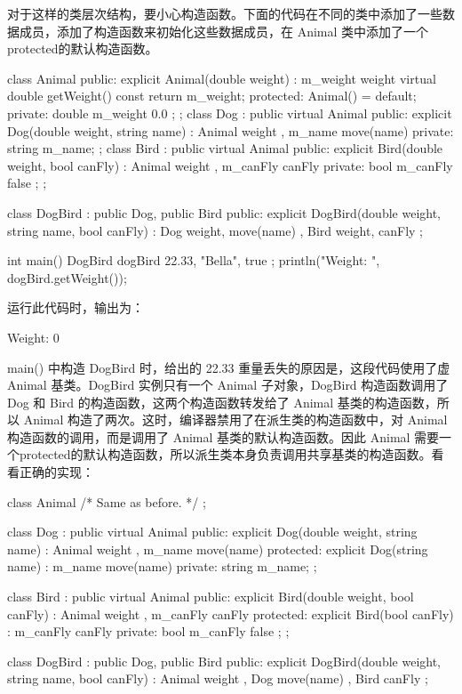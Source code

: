 对于这样的类层次结构，要小心构造函数。下面的代码在不同的类中添加了一些数据成员，添加了构造函数来初始化这些数据成员，在 Animal 类中添加了一个protected的默认构造函数。

\begin{cpp}
class Animal
{
    public:
        explicit Animal(double weight) : m_weight { weight } {}
        virtual double getWeight() const { return m_weight; }
    protected:
        Animal() = default;
    private:
        double m_weight { 0.0 };
};
class Dog : public virtual Animal
{
    public:
        explicit Dog(double weight, string name)
            : Animal { weight }, m_name { move(name) } {}
    private:
        string m_name;
};
class Bird : public virtual Animal
{
    public:
        explicit Bird(double weight, bool canFly)
            : Animal { weight }, m_canFly { canFly } {}
    private:
        bool m_canFly { false };
};

class DogBird : public Dog, public Bird
{
    public:
        explicit DogBird(double weight, string name, bool canFly)
            : Dog { weight, move(name) }, Bird { weight, canFly } {}
};

int main()
{
    DogBird dogBird { 22.33, "Bella", true };
    println("Weight: {}", dogBird.getWeight());
}
\end{cpp}

运行此代码时，输出为：

\begin{cpp}
Weight: 0
\end{cpp}

main() 中构造 DogBird 时，给出的 22.33 重量丢失的原因是，这段代码使用了虚 Animal 基类。DogBird 实例只有一个 Animal 子对象，DogBird 构造函数调用了 Dog 和 Bird 的构造函数，这两个构造函数转发给了 Animal 基类的构造函数，所以 Animal 构造了两次。这时，编译器禁用了在派生类的构造函数中，对 Animal 构造函数的调用，而是调用了 Animal 基类的默认构造函数。因此 Animal 需要一个protected的默认构造函数，所以派生类本身负责调用共享基类的构造函数。看看正确的实现：

\begin{cpp}
class Animal { /* Same as before. */ };

class Dog : public virtual Animal
{
    public:
        explicit Dog(double weight, string name)
            : Animal { weight }, m_name { move(name) } {}
    protected:
        explicit Dog(string name) : m_name { move(name) } {}
    private:
        string m_name;
};

class Bird : public virtual Animal
{
    public:
        explicit Bird(double weight, bool canFly)
            : Animal { weight }, m_canFly { canFly } {}
    protected:
        explicit Bird(bool canFly) : m_canFly { canFly } {}
    private:
        bool m_canFly { false };
};

class DogBird : public Dog, public Bird
{
    public:
        explicit DogBird(double weight, string name, bool canFly)
            : Animal { weight }, Dog { move(name) }, Bird { canFly } {}
};
\end{cpp}

